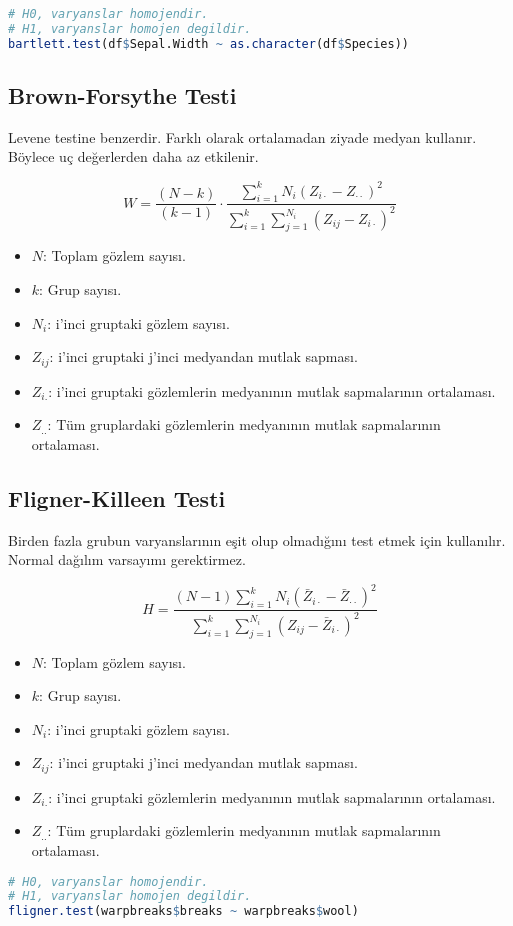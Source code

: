 \begin{lstlisting}[language=R]
# H0, varyanslar homojendir.
# H1, varyanslar homojen degildir.
bartlett.test(df$Sepal.Width ~ as.character(df$Species))
\end{lstlisting}

\subsection{Brown-Forsythe Testi}
Levene testine benzerdir. Farklı olarak ortalamadan ziyade medyan kullanır. Böylece uç değerlerden daha az etkilenir.

\[
W = \frac{(N - k)}{(k - 1)} \cdot \frac{\sum_{i=1}^{k} N_i (Z_{i \cdot} - Z_{\cdot \cdot})^2}{\sum_{i=1}^{k} \sum_{j=1}^{N_i} (Z_{ij} - Z_{i \cdot})^2}
\]

\begin{itemize}
	\item $N$: Toplam gözlem sayısı.
	\item $k$: Grup sayısı.
	\item $N_i$: i'inci gruptaki gözlem sayısı.
	\item $Z_{ij}$: i'inci gruptaki j'inci medyandan mutlak sapması.
	\item $Z_{i.}$: i'inci gruptaki gözlemlerin medyanının mutlak sapmalarının ortalaması.
	\item $Z_{..}$: Tüm gruplardaki gözlemlerin medyanının mutlak sapmalarının ortalaması.
\end{itemize}

\subsection{Fligner-Killeen Testi}
Birden fazla grubun varyanslarının eşit olup olmadığını test etmek için kullanılır. Normal dağılım varsayımı gerektirmez. 

\[
H = \frac{(N - 1) \sum_{i=1}^{k} N_i (\bar{Z}_{i \cdot} - \bar{Z}_{\cdot \cdot})^2}{\sum_{i=1}^{k} \sum_{j=1}^{N_i} (Z_{ij} - \bar{Z}_{i \cdot})^2}
\]

\begin{itemize}
	\item $N$: Toplam gözlem sayısı.
	\item $k$: Grup sayısı.
	\item $N_i$: i'inci gruptaki gözlem sayısı.
	\item $Z_{ij}$: i'inci gruptaki j'inci medyandan mutlak sapması.
	\item $Z_{i.}$: i'inci gruptaki gözlemlerin medyanının mutlak sapmalarının ortalaması.
	\item $Z_{..}$: Tüm gruplardaki gözlemlerin medyanının mutlak sapmalarının ortalaması.
\end{itemize}

\begin{lstlisting}[language=R]
# H0, varyanslar homojendir.
# H1, varyanslar homojen degildir.
fligner.test(warpbreaks$breaks ~ warpbreaks$wool)
\end{lstlisting}

\newpage